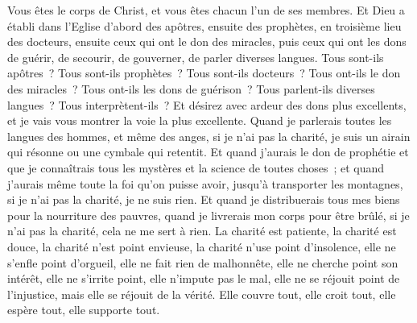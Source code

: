 \begin{multicols}{2}
Vous êtes le corps de Christ, et vous êtes chacun l'un de ses membres.
Et Dieu a établi dans l'Eglise d'abord des apôtres, ensuite des prophètes, en troisième lieu des docteurs, ensuite ceux qui ont le don des miracles, puis ceux qui ont les dons de guérir, de secourir, de gouverner, de parler diverses langues.
Tous sont-ils apôtres~? Tous sont-ils prophètes~? Tous sont-ils docteurs~? Tous ont-ils le don des miracles~?
Tous ont-ils les dons de guérison~? Tous parlent-ils diverses langues~? Tous interprètent-ils~?
Et désirez avec ardeur des dons plus excellents, et je vais vous montrer la voie la plus excellente.
\VerseOne{}Quand je parlerais toutes les langues des hommes, et même des anges, si je n'ai pas la charité, je suis un airain qui résonne ou une cymbale qui retentit.
Et quand j'aurais le don de prophétie et que je connaîtrais tous les mystères et la science de toutes choses~; et quand j'aurais même toute la foi qu'on puisse avoir, jusqu'à transporter les montagnes, si je n'ai pas la charité, je ne suis rien.
Et quand je distribuerais tous mes biens pour la nourriture des pauvres, quand je livrerais mon corps pour être brûlé, si je n'ai pas la charité, cela ne me sert à rien.
La charité est patiente, la charité est douce, la charité n'est point envieuse, la charité n'use point d'insolence, elle ne s'enfle point d'orgueil,
elle ne fait rien de malhonnête, elle ne cherche point son intérêt, elle ne s'irrite point, elle n'impute pas le mal,
elle ne se réjouit point de l'injustice, mais elle se réjouit de la vérité.
Elle couvre tout, elle croit tout, elle espère tout, elle supporte tout.

\end{multicols}
